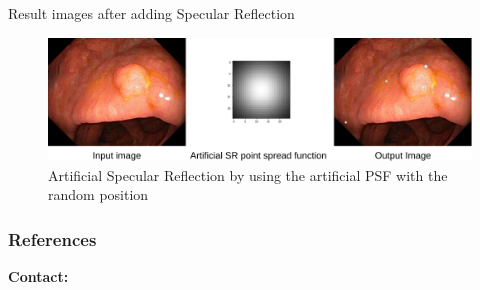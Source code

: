 \documentclass{libs/ufc_format}
\begin{document}
\begin{frame}{Result images after adding Specular Reflection}






    \begin{figure}
        \centering
        \includegraphics[width=1\textwidth]{libs/srres4.png}
        \caption{Artificial Specular Reflection by using the artificial PSF with the random position}
        \label{sr_inpainted}
    \end{figure}
\end{frame}

\begin{frame}[shrink=50]
    \frametitle{References}
    \printbibliography
\end{frame}

\begin{frame}{}
    \centering
    \huge{\textbf{}}

    \vspace{1cm}

    \Large{\textbf{Contact:}}
    \newline
    \vspace*{0.5cm}
    \large{}
\end{frame}
\end{document}
